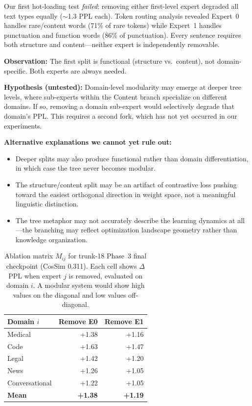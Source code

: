 \documentclass{article}
\begin{document}
Our first hot-loading test \emph{failed}: removing either first-level expert
degraded all text types equally ($\sim$1.3 PPL each). Token routing analysis
revealed Expert~0 handles rare/content words (71\% of rare tokens) while
Expert~1 handles punctuation and function words (86\% of punctuation). Every
sentence requires both structure and content---neither expert is independently
removable.

\textbf{Observation:} The first split is functional (structure vs.\ content),
not domain-specific. Both experts are always needed.

\textbf{Hypothesis (untested):} Domain-level modularity may emerge at deeper
tree levels, where sub-experts within the Content branch specialize on
different domains. If so, removing a domain sub-expert would selectively
degrade that domain's PPL. This requires a second fork, which has not yet
occurred in our experiments.

\textbf{Alternative explanations we cannot yet rule out:}
\begin{itemize}
    \item Deeper splits may also produce functional rather than domain
          differentiation, in which case the tree never becomes modular.
    \item The structure/content split may be an artifact of contrastive loss
          pushing toward the easiest orthogonal direction in weight space,
          not a meaningful linguistic distinction.
    \item The tree metaphor may not accurately describe the learning dynamics
          at all---the branching may reflect optimization landscape geometry
          rather than knowledge organization.
\end{itemize}

\begin{table}[h]
\centering
\caption{Ablation matrix $M_{ij}$ for trunk-18 Phase~3 final checkpoint
(CosSim 0.311). Each cell shows $\Delta$PPL when expert $j$ is removed,
evaluated on domain $i$. A modular system would show high values on the
diagonal and low values off-diagonal.}
\label{tab:ablation-matrix}
\begin{tabular}{@{}lrr@{}}
\toprule
Domain $i$ & Remove E0 & Remove E1 \\
\midrule
Medical       & +1.38 & +1.16 \\
Code          & +1.63 & +1.47 \\
Legal         & +1.42 & +1.20 \\
News          & +1.26 & +1.05 \\
Conversational & +1.22 & +1.05 \\
\midrule
\textbf{Mean} & \textbf{+1.38} & \textbf{+1.19} \\
\bottomrule
\end{tabular}
\end{table}
\end{document}
